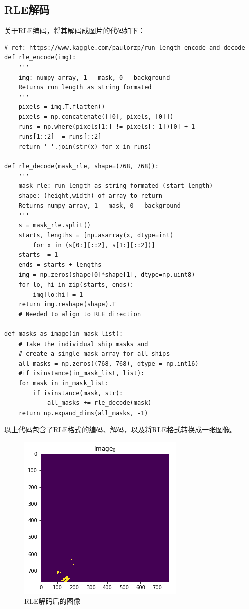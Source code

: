 \subsection{RLE解码}

关于RLE编码，将其解码成图片的代码如下：

\begin{lstlisting}
# ref: https://www.kaggle.com/paulorzp/run-length-encode-and-decode
def rle_encode(img):
    '''
    img: numpy array, 1 - mask, 0 - background
    Returns run length as string formated
    '''
    pixels = img.T.flatten()
    pixels = np.concatenate([[0], pixels, [0]])
    runs = np.where(pixels[1:] != pixels[:-1])[0] + 1
    runs[1::2] -= runs[::2]
    return ' '.join(str(x) for x in runs)

def rle_decode(mask_rle, shape=(768, 768)):
    '''
    mask_rle: run-length as string formated (start length)
    shape: (height,width) of array to return 
    Returns numpy array, 1 - mask, 0 - background
    '''
    s = mask_rle.split()
    starts, lengths = [np.asarray(x, dtype=int)
        for x in (s[0:][::2], s[1:][::2])]
    starts -= 1
    ends = starts + lengths
    img = np.zeros(shape[0]*shape[1], dtype=np.uint8)
    for lo, hi in zip(starts, ends):
        img[lo:hi] = 1
    return img.reshape(shape).T
    # Needed to align to RLE direction

def masks_as_image(in_mask_list):
    # Take the individual ship masks and
    # create a single mask array for all ships
    all_masks = np.zeros((768, 768), dtype = np.int16)
    #if isinstance(in_mask_list, list):
    for mask in in_mask_list:
        if isinstance(mask, str):
            all_masks += rle_decode(mask)
    return np.expand_dims(all_masks, -1)
\end{lstlisting}

以上代码包含了RLE格式的编码、解码，以及将RLE格式转换成一张图像。

\begin{figure}
\centering
\includegraphics[width=0.6\linewidth]{body/preprocessing_pic/1}
\caption{RLE解码后的图像}
\label{fig::preprocessing1}
\end{figure}

